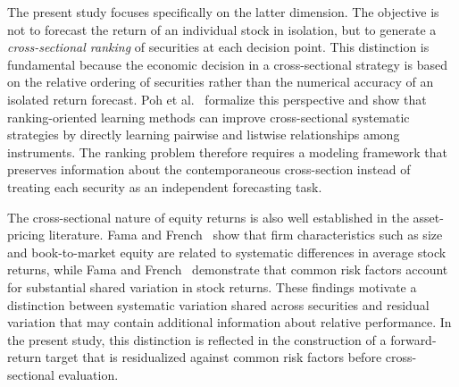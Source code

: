 The present study focuses specifically on the latter dimension. The objective is not to forecast the return of an individual stock in isolation, but to generate a \emph{cross-sectional ranking} of securities at each decision point. This distinction is fundamental because the economic decision in a cross-sectional strategy is based on the relative ordering of securities rather than the numerical accuracy of an isolated return forecast. Poh et al.~\cite{Poh2021} formalize this perspective and show that ranking-oriented learning methods can improve cross-sectional systematic strategies by directly learning pairwise and listwise relationships among instruments. The ranking problem therefore requires a modeling framework that preserves information about the contemporaneous cross-section instead of treating each security as an independent forecasting task.

\medskip

The cross-sectional nature of equity returns is also well established in the asset-pricing literature. Fama and French~\cite{FamaFrench1992} show that firm characteristics such as size and book-to-market equity are related to systematic differences in average stock returns, while Fama and French~\cite{FamaFrench1993} demonstrate that common risk factors account for substantial shared variation in stock returns. These findings motivate a distinction between systematic variation shared across securities and residual variation that may contain additional information about relative performance. In the present study, this distinction is reflected in the construction of a forward-return target that is residualized against common risk factors before cross-sectional evaluation.

\medskip


